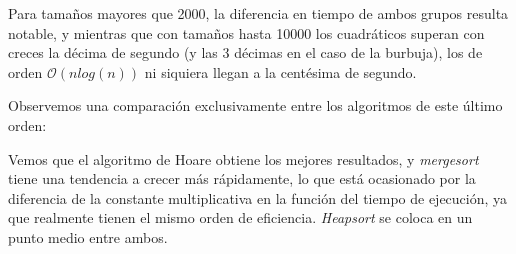 
Para tamaños mayores que 2000, la diferencia en tiempo de ambos grupos resulta notable, y mientras que con tamaños hasta 10000 los cuadráticos superan con creces la décima de segundo (y las 3 décimas en el caso de la burbuja), los de orden $\mathcal{O}(nlog(n))$ ni siquiera llegan a la centésima de segundo.

Observemos una comparación exclusivamente entre los algoritmos de este último orden:


Vemos que el algoritmo de Hoare obtiene los mejores resultados, y \textit{mergesort} tiene una tendencia a crecer más rápidamente, lo que está ocasionado por la diferencia de la constante multiplicativa en la función del tiempo de ejecución, ya que realmente tienen el mismo orden de eficiencia. \textit{Heapsort} se coloca en un punto medio entre ambos.

